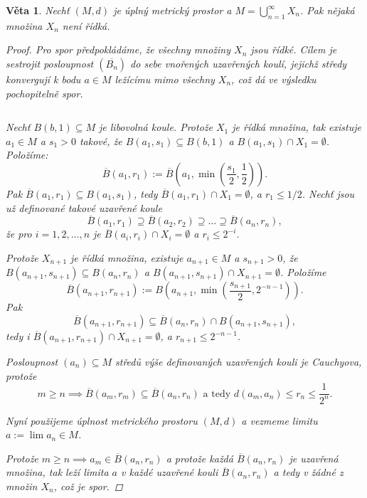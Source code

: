 \documentclass[10pt,a4paper]{article}
\newtheorem*{thm}{Věta}
\begin{document}
\begin{thm}
	Nechť $ (M,d) $ je úplný metrický prostor a $ \displaystyle M = \bigcup_{n=1}^{\infty} X_n$. Pak nějaká množina $X_n$ není řídká.\normalfont
	
	\begin{proof}
		Pro spor předpokládáme, že všechny množiny $ X_n $ jsou řídké. 
		Cílem je sestrojit posloupnost $(\overline{B_n})$ do sebe vnořených uzavřených koulí, jejichž středy konvergují k bodu $a \in M$ ležícímu mimo všechny $X_n$, což dá ve výsledku pochopitelně spor. 
		
		$ $
		
		Nechť $B(b, 1) \subseteq M$ je libovolná koule. 
		Protože $X_1$ je řídká množina, tak existuje $a_1 \in M$ a $s_1 > 0$ takové, že $B(a_1, s_1) \subseteq B(b, 1)$ a $B(a_1, s_1 ) \cap X_1 = \emptyset$. 
		Položíme:\[
		\overline{B}(a_1 , r_1 ) := \overline{B}\left(a_1 , \min\left(\frac{s_1}2, \frac 12\right)\right) .
		\]
		Pak $\overline{B}(a_1, r_1) \subseteq B(a_1, s_1 )$, tedy $\overline{B}(a_1 , r_1) \cap X_1 = \emptyset$, a $r_1 \leq 1/2$.
		Nechť jsou už definované takové uzavřené koule \[
		\overline{B}(a_1, r_1)\supseteq \overline{B}(a_2 , r_2 ) \supseteq \ldots \supseteq \overline{B}(a_n, r_n ) ,
		\]že pro $i=1,2,\ldots, n$ je $\overline B(a_i, r_i) \cap X_i = \emptyset$ a $ r_i \leq 2^{-i} $.
		
		Protože $X_{n+1}$ je řídká množina, existuje $a_{n+1} \in M$ a $s_{n+1} > 0$, že $B(a_{n+1} , s_{n+1} ) \subseteq B(a_n , r_n )$ a $B(a_{n+1} , s_{n+1} ) \cap X_{n+1} = \emptyset$. Položíme \[
		\overline B(a_{n+1} , r_{n+1} ) := B \left(a_{n+1}, \min\left(\frac{s_{n+1}}{2}, 2^{-n-1} \right)\right).
		\] Pak \[\overline B(a_{n+1} , r_{n+1} ) \subseteq \overline B(a_{n} , r_{n} ) \cap B(a_{n+1} , s_{n+1} ),
		\] tedy i $\overline B(a_{n+1} , r_{n+1} ) \cap X_{n+1} = \emptyset$, a $r_{n+1} \leq 2^{-n-1}$.
		
		Posloupnost $(a_n ) \subseteq M$ středů výše definovaných uzavřených kouli je Cauchyova, protože\[
		m \geq n \implies \overline B(a_m, r_m) \subseteq \overline B(a_n, r_n ) \text{ a tedy } d(a_m, a_n ) \leq r_n \leq \frac1{2^n}.
		\]
		
		Nyní použijeme úplnost metrického prostoru $(M, d)$ a vezmeme limitu $ a:= \lim a_n \in M $.
		
		Protože $m \geq n \implies a_m \in \overline B(a_n, r_n )$ a protože každá $\overline B(a_n, r_n )$ je uzavřená množina, tak leží limita $ a $ v každé uzavřené kouli $\overline B(a_n, r_n )$ a tedy v žádné z množin $X_n$, což je spor.
	\end{proof}

\end{thm}
\end{document}
